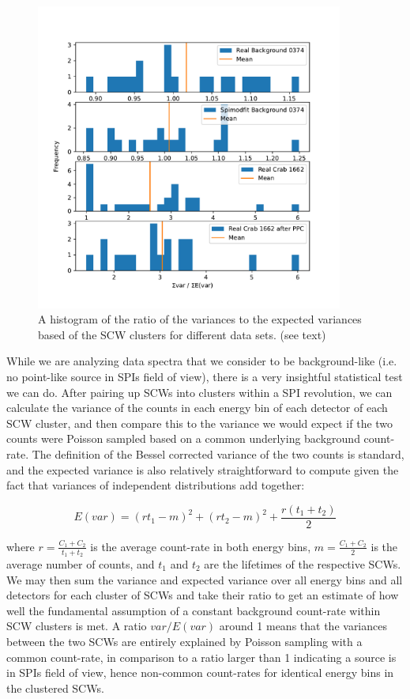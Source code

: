 \documentclass{article}
\begin{document}
\begin{figure}[h]
    \centering
    \includegraphics[width=0.9\textwidth]{Images/background_variance.pdf}
    \caption{A histogram of the ratio of the variances to the expected variances based of the SCW clusters for different data sets. (see text)}
    \label{plt bkg var}
\end{figure}

While we are analyzing data spectra that we consider to be background-like (i.e. no point-like source in SPIs field of view), there is a very insightful statistical test we can do. After pairing up SCWs into clusters within a SPI revolution, we can calculate the variance of the counts in each energy bin of each detector of each SCW cluster, and then compare this to the variance we would expect if the two counts were Poisson sampled based on a common underlying background count-rate. The definition of the Bessel corrected variance of the two counts is standard, and the expected variance is also relatively straightforward to compute given the fact that variances of independent distributions add together:

\begin{equation}
    E(var) = (rt_1 - m)^2 + (rt_2 - m)^2 + \frac{r(t_1+t_2)}{2}
\end{equation}

where $r=\frac{C_1+C_2}{t_1+t_2}$ is the average count-rate in both energy bins, $m=\frac{C_1+C_2}{2}$ is the average number of counts, and $t_1$ and $t_2$ are the lifetimes of the respective SCWs. We may then sum the variance and expected variance over all energy bins and all detectors for each cluster of SCWs and take their ratio to get an estimate of how well the fundamental assumption of a constant background count-rate within SCW clusters is met. A ratio $var / E(var)$ around 1 means that the variances between the two SCWs are entirely explained by Poisson sampling with a common count-rate, in comparison to a ratio larger than 1 indicating a source is in SPIs field of view, hence non-common count-rates for identical energy bins in the clustered SCWs.
\end{document}
